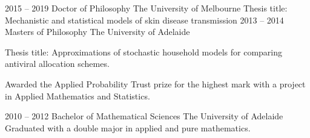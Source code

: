 \documentclass[9pt]{developercv} %
\begin{document}


\begin{entrylist}
	\entry
		{2015 -- 2019}
		{Doctor of Philosophy}
		{The University of Melbourne}
		{Thesis title: Mechanistic and statistical models of skin disease transmission}
	\entry
		{2013 -- 2014}
		{Masters of Philosophy}
		{The University of Adelaide}
		{Thesis title: Approximations of stochastic household models for comparing antiviral allocation schemes.
		
		Awarded the Applied Probability Trust prize for the highest mark with a project in Applied Mathematics and Statistics.}
	\entry
		{2010 -- 2012}
		{Bachelor of Mathematical Sciences}
		{The University of Adelaide}
		{Graduated with a double major in applied and pure mathematics.}
\end{entrylist}


\newpage
{}
\end{document}
